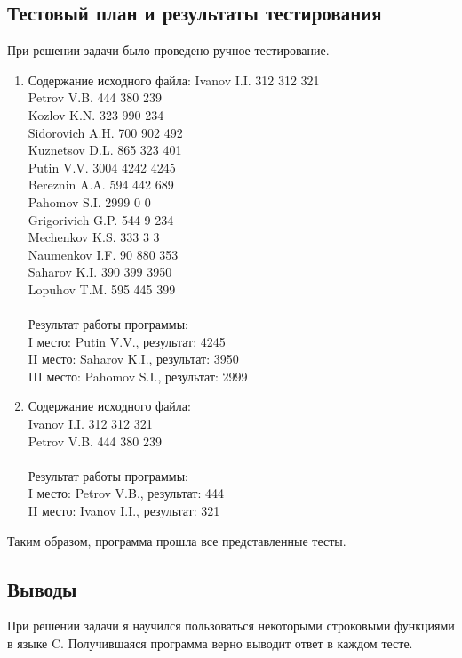 \documentclass[12pt,a4paper]{report}
\begin{document}
\subsection{Тестовый план и результаты тестирования}
При решении задачи было проведено ручное тестирование.
\begin{enumerate}
\item
Содержание исходного файла:
Ivanov I.I. 312 312 321 \\
Petrov V.B. 444 380 239 \\
Kozlov K.N. 323 990 234 \\
Sidorovich A.H. 700 902 492 \\
Kuznetsov D.L. 865 323 401 \\
Putin V.V. 3004 4242 4245 \\
Bereznin A.A. 594 442 689 \\
Pahomov S.I. 2999 0 0 \\
Grigorivich G.P. 544 9 234 \\
Mechenkov K.S. 333 3 3 \\
Naumenkov I.F. 90 880 353 \\
Saharov K.I. 390 399 3950 \\
Lopuhov T.M. 595 445 399 \\ \\
Результат работы программы: \\
I место: Putin V.V., результат: 4245 \\
II место: Saharov K.I., результат: 3950 \\
III место: Pahomov S.I., результат: 2999
\item 
Содержание исходного файла: \\
Ivanov I.I. 312 312 321 \\
Petrov V.B. 444 380 239 \\ \\
Результат работы программы: \\
I место: Petrov V.B., результат: 444 \\
II место: Ivanov I.I., результат: 321 \\
\end{enumerate}
Таким образом, программа прошла все представленные тесты.
\subsection{Выводы}
При решении задачи я научился пользоваться некоторыми строковыми функциями в языке C. Получившаяся программа верно выводит ответ в каждом тесте. \\ \\
\newpage
\end{document}
